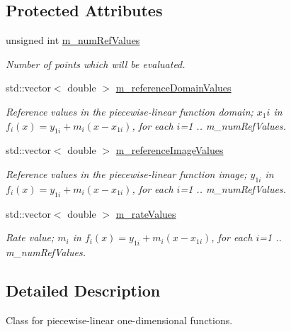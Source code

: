 \subsection*{Protected Attributes}
\begin{DoxyCompactItemize}
\item 
unsigned int \hyperlink{class_q_u_e_s_o_1_1_piecewise_linear1_d1_d_function_a1ff5c7e5243f6a763409a68e86681129}{m\-\_\-num\-Ref\-Values}
\begin{DoxyCompactList}\small\item\em Number of points which will be evaluated. \end{DoxyCompactList}\item 
std\-::vector$<$ double $>$ \hyperlink{class_q_u_e_s_o_1_1_piecewise_linear1_d1_d_function_abda9e4143096bf0bf935b7c9173aa2cc}{m\-\_\-reference\-Domain\-Values}
\begin{DoxyCompactList}\small\item\em Reference values in the piecewise-\/linear function domain; $ x_1i $ in $ f_i(x) = y_{1i} + m_i (x - x_{1i})$, for each $ i $=1 .. {\ttfamily m\-\_\-num\-Ref\-Values}. \end{DoxyCompactList}\item 
std\-::vector$<$ double $>$ \hyperlink{class_q_u_e_s_o_1_1_piecewise_linear1_d1_d_function_a83a27b74cb337be9d5b3e2b91d8ab6ad}{m\-\_\-reference\-Image\-Values}
\begin{DoxyCompactList}\small\item\em Reference values in the piecewise-\/linear function image; $ y_{1i} $ in $ f_i(x) = y_{1i} + m_i (x - x_{1i})$, for each $ i $=1 .. {\ttfamily m\-\_\-num\-Ref\-Values}. \end{DoxyCompactList}\item 
std\-::vector$<$ double $>$ \hyperlink{class_q_u_e_s_o_1_1_piecewise_linear1_d1_d_function_aef7d37fe499c0e8f3bb6261f1b4e8147}{m\-\_\-rate\-Values}
\begin{DoxyCompactList}\small\item\em Rate value; $ m_i $ in $ f_i(x) = y_{1i} + m_i (x - x_{1i})$, for each $ i $=1 .. {\ttfamily m\-\_\-num\-Ref\-Values}. \end{DoxyCompactList}\end{DoxyCompactItemize}


\subsection{Detailed Description}
Class for piecewise-\/linear one-\/dimensional functions. 


